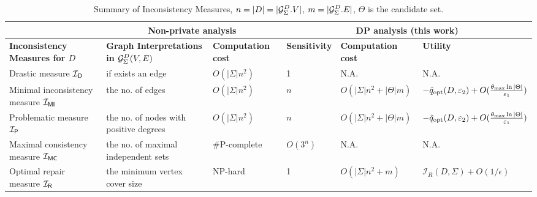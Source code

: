 \begin{table*}[h]
\centering
\footnotesize
\begin{tabular}{|l|ll|lll|}
\hline
                                      & \multicolumn{2}{c|}{\textbf{Non-private analysis \cite{LivshitsKTIKR21}}}                           & \multicolumn{3}{c|}{\textbf{DP analysis (this work)}}                                                                         \\ \hline
\textbf{Inconsistency Measures for $D$} & \multicolumn{1}{l|}{\textbf{Graph Interpretations in ${\mathcal{G}_{{\Sigma}}^{D}}(V,E)$}}     & \textbf{Computation cost} & \multicolumn{1}{l|}{\textbf{Sensitivity}}      & \multicolumn{1}{l|}{\textbf{Computation cost}} & \textbf{Utility} \\ \hline
Drastic measure     $\mathcal{I_\mathsf{D}}$                       & \multicolumn{1}{l|}{if exists an edge}                        & $O(|\Sigma|n^2)$    & \multicolumn{1}{l|}{1}                         & \multicolumn{1}{l|}{N.A.}                                    &    N.A.            \\ \hline
Minimal inconsistency measure    $\mathcal{I_{\mathsf{MI}}}$       & \multicolumn{1}{l|}{the no. of edges}                      & $O(|\Sigma|n^2)$  & \multicolumn{1}{l|}{$n$}                    & \multicolumn{1}{l|}{$O(|\Sigma|n^2 + |\Theta|m)$}                                 &       $-\tilde{q}_{\normalfont{\text{opt}}}(D,\varepsilon_2)+O(\frac{\theta_{\max}\ln|\Theta|}{\varepsilon_1})$           \\ \hline
Problematic measure         $\mathcal{I_\mathsf{P}}$               & \multicolumn{1}{l|}{the no. of nodes with positive degrees} & $O(|\Sigma|n^2)$  & \multicolumn{1}{l|}{$n$}                    & \multicolumn{1}{l|}{$O(|\Sigma|n^2+|\Theta|m)$}                                 &         $-\tilde{q}_{\normalfont{\text{opt}}}(D,\varepsilon_2)+O(\frac{\theta_{\max}\ln|\Theta|}{\varepsilon_1})$               \\ \hline
Maximal consistency measure    $\mathcal{I_\mathsf{MC}}$           & \multicolumn{1}{l|}{the no. of maximal independent sets}   & \#P-complete              & \multicolumn{1}{l|}{$O(3^n)$} & \multicolumn{1}{l|}{N.A.}                                    &    N.A.              \\ \hline
Optimal repair measure        $\mathcal{I_\mathsf{R}}$               & \multicolumn{1}{l|}{the minimum vertex cover size}            & NP-hard                   & \multicolumn{1}{l|}{1}                    & \multicolumn{1}{l|}{$O(|\Sigma|n^2+ m)$}                                 &             $\mathcal{I}_R(D,\Sigma) + O(1/\epsilon) $     \\ \hline
\end{tabular}
\caption{Summary of Inconsistency Measures, $n=|D|=|{\mathcal{G}_{{\Sigma}}^{D}}.V|$, $m=|{\mathcal{G}_{{\Sigma}}^{D}}.E|$, $\Theta$ is the candidate set.}\label{tab:summary} 
\end{table*}

